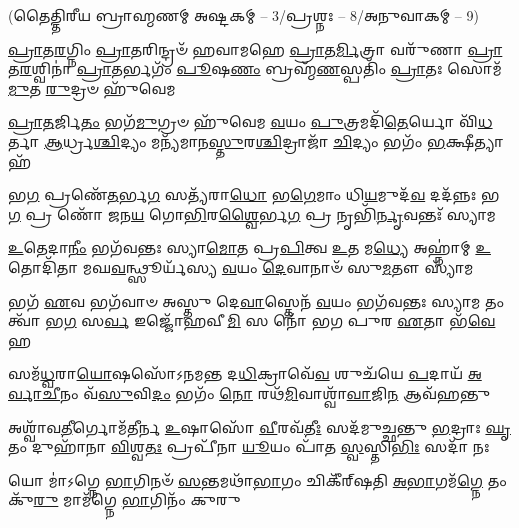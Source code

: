 

\vspace{-1ex}
\centerline{\scriptsize(𑌤𑍈𑌤𑍍𑌤𑌿𑌰𑍀𑌯 𑌬𑍍𑌰𑌾𑌹𑍍𑌮𑌣𑌮𑍍 𑌅𑌷𑍍𑌟𑌕𑌮𑍍 – 3/𑌪𑍍𑌰𑌶𑍍𑌨𑌃 – 8/𑌅𑌨𑍁𑌵𑌾𑌕𑌮𑍍 – 9)}


\twolineshloka
{\-\ul{𑌪𑍍𑌰𑌾}\-𑌤\-\ul{𑌰}\-𑌗𑍍𑌨𑌿𑌂 \ul{𑌪𑍍𑌰𑌾}\-𑌤𑌰𑌿𑌨𑍍𑌦𑍍𑌰𑍞᳴ 𑌹𑌵𑌾𑌮𑌹𑍇 \ul{𑌪𑍍𑌰𑌾}\-𑌤\-\ul{𑌰𑍍𑌮𑌿}\-𑌤𑍍𑌰𑌾 𑌵𑌰𑍁᳴𑌣𑌾 \ul{𑌪𑍍𑌰𑌾}\-𑌤\-\ul{𑌰}\-𑌶𑍍𑌵𑌿𑌨𑌾॑}
{\-\ul{𑌪𑍍𑌰𑌾}\-𑌤𑌰𑍍𑌭𑌗𑌂᳴ \ul{𑌪𑍂}\-𑌷\-\ul{𑌣𑌂} 𑌬𑍍𑌰𑌹𑍍𑌮᳴\-\ul{𑌣}\-𑌸𑍍𑌪𑌤𑌿𑌂᳴ \ul{𑌪𑍍𑌰𑌾}\-𑌤𑌃 𑌸𑍋𑌮᳴\-\ul{𑌮𑍁}\-𑌤 \ul{𑌰𑍁}\-𑌦𑍍𑌰𑍞 𑌹𑍁᳴𑌵𑍇𑌮}

\twolineshloka
{\-\ul{𑌪𑍍𑌰𑌾}\-\-\ul{𑌤}\-𑌰𑍍𑌜𑌿\-\ul{𑌤𑌂} 𑌭𑌗᳴\-\ul{𑌮𑍁}\-𑌗𑍍𑌰𑍞 𑌹𑍁᳴𑌵𑍇𑌮 \ul{𑌵}\-𑌯𑌂 \ul{𑌪𑍁}\-𑌤𑍍𑌰𑌮𑌦𑌿᳴\-\ul{𑌤𑍇}\-𑌰𑍍𑌯𑍋 𑌵𑌿᳴\-\ul{𑌧}\-𑌰𑍍𑌤𑌾}
{\-\ul{𑌆}\-𑌰𑍍𑌧𑍍𑌰\-\ul{𑌶𑍍𑌚𑌿}\-𑌦𑍍𑌯𑌂 𑌮𑌨𑍍𑌯᳴𑌮𑌾𑌨\-\ul{𑌸𑍍𑌤𑍁}\-𑌰\-\ul{𑌶𑍍𑌚𑌿}\-𑌦𑍍𑌰𑌾𑌜𑌾᳴ \ul{𑌚𑌿}\-𑌦𑍍𑌯𑌂 𑌭𑌗𑌂᳴ \ul{𑌭}\-𑌕𑍍𑌷𑍀𑌤𑍍𑌯𑌾𑌹᳴}

\twolineshloka
{𑌭\-\ul{𑌗} 𑌪𑍍𑌰𑌣𑍇᳴\-\ul{𑌤}\-𑌰𑍍𑌭\-\ul{𑌗} 𑌸𑌤𑍍𑌯᳴𑌰𑌾\-\ul{𑌧𑍋} 𑌭\-\ul{𑌗𑍇}\-𑌮𑌾𑌂 𑌧𑌿\-\ul{𑌯}\-𑌮𑍁𑌦᳴\-\ul{𑌵} 𑌦𑌦᳴𑌨𑍍𑌨𑌃}
{𑌭\-\ul{𑌗} 𑌪𑍍𑌰 𑌣𑍋᳴ 𑌜𑌨\-\ul{𑌯} 𑌗𑍋\-\ul{𑌭𑌿}\-𑌰\-\ul{𑌶𑍍𑌵𑍈}\-𑌰𑍍𑌭\-\ul{𑌗} 𑌪𑍍𑌰 𑌨𑍃𑌭𑌿᳴\-\ul{𑌰𑍍𑌨𑍃}\-𑌵𑌨𑍍𑌤𑌃᳴ 𑌸𑍍𑌯𑌾𑌮}

\twolineshloka
{\-\ul{𑌉}\-𑌤𑍇𑌦𑌾\-\ul{𑌨𑍀𑌂} 𑌭𑌗᳴𑌵𑌨𑍍𑌤𑌃 𑌸𑍍𑌯𑌾\-\ul{𑌮𑍋}\-𑌤 𑌪𑍍𑌰\-\ul{𑌪𑌿}\-𑌤𑍍𑌵 \ul{𑌉}\-𑌤 𑌮\-\ul{𑌧𑍍𑌯𑍇} 𑌅𑌹𑍍𑌨𑌾॑𑌮𑍍}
{\-\ul{𑌉}\-𑌤𑍋𑌦𑌿᳴𑌤𑌾 𑌮𑌘\-\ul{𑌵}\-𑌨𑍍𑌥𑍍𑌸𑍂𑌰𑍍𑌯᳴𑌸𑍍𑌯 \ul{𑌵}\-𑌯𑌂 \ul{𑌦𑍇}\-𑌵𑌾𑌨𑌾𑍞᳴ 𑌸𑍁\-\ul{𑌮}\-𑌤𑍗 𑌸𑍍𑌯𑌾᳴𑌮}

\twolineshloka
{𑌭𑌗᳴ \ul{𑌏}\-𑌵 𑌭𑌗᳴𑌵𑌾𑍞 𑌅𑌸𑍍𑌤𑍁 𑌦𑍇\-\ul{𑌵𑌾}\-𑌸𑍍𑌤𑍇𑌨᳴ \ul{𑌵}\-𑌯𑌂 𑌭𑌗᳴𑌵𑌨𑍍𑌤𑌃 𑌸𑍍𑌯𑌾𑌮}
{𑌤𑌂 𑌤𑍍𑌵𑌾᳴ 𑌭\-\ul{𑌗} 𑌸\-\ul{𑌰𑍍𑌵} 𑌇𑌜𑍍𑌜𑍋᳴𑌹𑌵𑍀\-\ul{𑌮𑌿} 𑌸 𑌨𑍋᳴ 𑌭𑌗 𑌪𑍁𑌰 \ul{𑌏}\-𑌤𑌾 𑌭᳴\-\ul{𑌵𑍇}\-𑌹}

\twolineshloka
{𑌸𑌮᳴\-\ul{𑌧𑍍𑌵}\-𑌰𑌾\-\ul{𑌯𑍋}\-𑌷𑌸𑍋᳴𑌽𑌨𑌮𑌨𑍍𑌤 𑌦\-\ul{𑌧𑌿}\-𑌕𑍍𑌰𑌾𑌵𑍇᳴\-\ul{𑌵} 𑌶𑍁𑌚᳴𑌯𑍇 \ul{𑌪}\-𑌦𑌾𑌯᳴}
{\-\ul{𑌅}\-\-\ul{𑌰𑍍𑌵𑌾}\-\-\ul{𑌚𑍀}\-𑌨𑌂 𑌵᳴\-\ul{𑌸𑍁}\-𑌵𑌿\-\ul{𑌦𑌂} 𑌭𑌗𑌂᳴ \ul{𑌨𑍋} 𑌰𑌥᳴\-\ul{𑌮𑌿}\-𑌵𑌾𑌶𑍍𑌵𑌾᳴\-\ul{𑌵𑌾}\-𑌜𑌿\-\ul{𑌨} 𑌆𑌵᳴𑌹𑌨𑍍𑌤𑍁}

\twolineshloka
{𑌅𑌶𑍍𑌵𑌾᳴𑌵\-\ul{𑌤𑍀}\-𑌰𑍍𑌗𑍋𑌮᳴𑌤𑍀𑌰𑍍𑌨 \ul{𑌉}\-𑌷𑌾𑌸𑍋᳴ \ul{𑌵𑍀}\-𑌰𑌵᳴\-\ul{𑌤𑍀𑌃} 𑌸𑌦᳴𑌮𑍁𑌚𑍍𑌛𑌨𑍍𑌤𑍁 \ul{𑌭}\-𑌦𑍍𑌰𑌾𑌃}
{\-\ul{𑌘𑍃}\-𑌤𑌂 𑌦𑍁𑌹𑌾᳴𑌨𑌾 \ul{𑌵𑌿}\-𑌶𑍍𑌵\-\ul{𑌤𑌃} 𑌪𑍍𑌰𑌪𑍀᳴𑌨𑌾 \ul{𑌯𑍂}\-𑌯𑌂 𑌪𑌾᳴𑌤 \ul{𑌸𑍍𑌵}\-𑌸𑍍𑌤𑌿\-\ul{𑌭𑌿𑌃} 𑌸𑌦𑌾᳴ 𑌨𑌃}

\twolineshloka
{𑌯𑍋 𑌮𑌾॑𑌽𑌗𑍍𑌨𑍇 \ul{𑌭𑌾}\-𑌗𑌿𑌨𑍞᳴ \ul{𑌸}\-𑌨𑍍𑌤𑌮𑌥𑌾᳴\-\ul{𑌭𑌾}\-𑌗𑌂 𑌚𑌿𑌕𑍀᳴𑌰𑍍‌𑌷𑌤𑌿}
{\-\ul{𑌅}\-\-\ul{𑌭𑌾}\-𑌗𑌮᳴\-\ul{𑌗𑍍𑌨𑍇} 𑌤𑌂 𑌕𑍁᳴\-\ul{𑌰𑍁} 𑌮𑌾𑌮᳴𑌗𑍍𑌨𑍇 \ul{𑌭𑌾}\-𑌗𑌿𑌨𑌂᳴ 𑌕𑍁𑌰𑍁}

